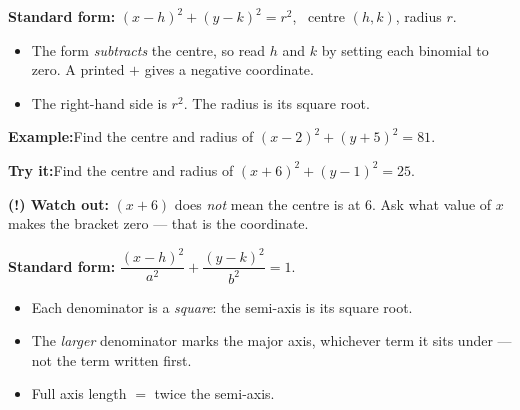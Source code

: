 \documentclass[12pt]{article}
\begin{document}


\begin{formulabox}
\textbf{Standard form:} \quad $(x-h)^2 + (y-k)^2 = r^2$, \ centre $(h,k)$,
radius $r$.
\begin{itemize}[leftmargin=0.8cm, itemsep=1pt, topsep=2pt]
  \item The form \emph{subtracts} the centre, so read $h$ and $k$ by setting
        each binomial to zero. A printed $+$ gives a negative coordinate.
  \item The right-hand side is $r^2$. The radius is its square root.
\end{itemize}
\end{formulabox}

\begin{examplebox}
\textbf{Example:}\quad Find the centre and radius of $(x-2)^2 + (y+5)^2 = 81$.
\end{examplebox}

\begin{tryitbox}
\textbf{Try it:}\quad Find the centre and radius of $(x+6)^2 + (y-1)^2 = 25$.\\[2pt]
\end{tryitbox}

\begin{watchoutbox}
\textbf{(!) Watch out:} $(x+6)$ does \emph{not} mean the centre is at $6$. Ask
what value of $x$ makes the bracket zero --- that is the coordinate.
\end{watchoutbox}


\begin{formulabox}
\textbf{Standard form:} \quad
$\dfrac{(x-h)^2}{a^2} + \dfrac{(y-k)^2}{b^2} = 1$.
\begin{itemize}[leftmargin=0.8cm, itemsep=1pt, topsep=2pt]
  \item Each denominator is a \emph{square}: the semi-axis is its square root.
  \item The \emph{larger} denominator marks the major axis, whichever term it
        sits under --- not the term written first.
  \item Full axis length $=$ twice the semi-axis.
\end{itemize}
\end{formulabox}
\end{document}
